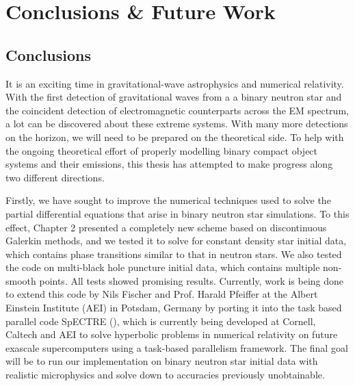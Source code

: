 \chapter{Conclusions \& Future Work}
\label{chap:conc}

\section{Conclusions}

It is an exciting time in gravitational-wave astrophysics and numerical relativity. With the first detection of gravitational waves from a a binary neutron star and the coincident detection of electromagnetic counterparts across the EM spectrum, a lot can be discovered about these extreme systems. With many more detections on the horizon, we will need to be prepared on the theoretical side. To help with the ongoing theoretical effort of properly modelling binary compact object systems and their emissions, this thesis has attempted to make progress along two different directions.

Firstly, we have sought to improve the numerical techniques used to solve the partial differential equations that arise in binary neutron star simulations. To this effect, Chapter 2 presented a completely new scheme based on discontinuous Galerkin methods, and we tested it to solve for constant density star initial data, which contains phase transitions similar to that in neutron stars. We also tested the code on multi-black hole puncture initial data, which contains multiple non-smooth points. All tests showed promising results. Currently, work is being done to extend this code by Nils Fischer and Prof. Harald Pfeiffer at the Albert Einstein Institute (AEI) in Potsdam, Germany by porting it into the task based parallel code SpECTRE (\cite{kidder2016spectre}), which is currently being developed at Cornell, Caltech and AEI to solve hyperbolic problems in numerical relativity on future exascale supercomputers using a task-based parallelism framework. The final goal will be to run our implementation on binary neutron star initial data with realistic microphysics and solve down to accuracies previously unobtainable.

